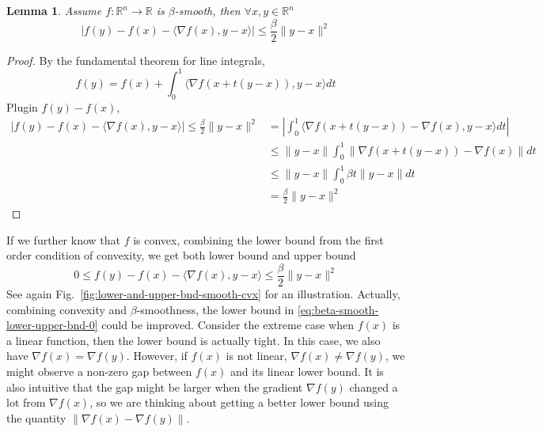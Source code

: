 \documentclass{scrartcl}
\newtheorem{lemma}{Lemma}
\newcommand{\RR}{\mathbb{R}}
\begin{document}
\begin{lemma}
  Assume $f:\RR^n\rightarrow \RR$ is $\beta$-smooth, then $\forall x,y\in\RR^n$
  \[
  |f(y)-f(x)- \langle \nabla f(x), y-x\rangle | \leq \frac{\beta}{2}\|y-x\|^2
  \]
\end{lemma}
\begin{proof}
By the fundamental theorem for line integrals,
\[
  f(y) = f(x) + \int_{0}^1 \langle \nabla f(x + t(y-x)), y-x\rangle dt
\]
Plugin $f(y)-f(x)$,
\[
  \begin{aligned}
  |f(y)-f(x)- \langle \nabla f(x), y-x\rangle | \leq \frac{\beta}{2}\|y-x\|^2
  &= \left| \int_0^1 \langle \nabla f(x+t(y-x))-\nabla f(x), y-x\rangle dt \right| \\
  &\leq \|y-x\|\int_0^1 \|\nabla f(x+t(y-x))-\nabla f(x)\| dt \\
  &\leq \|y-x\|\int_0^1 \beta t\|y-x\|dt \\
  &=\frac{\beta}{2}\|y-x\|^2
  \end{aligned}
\]
\end{proof}

If we further know that $f$ is convex, combining the lower bound from the first order condition of
convexity, we get both lower bound and upper bound
\begin{equation}
  0 \leq f(y) - f(x) - \langle \nabla f(x), y-x\rangle \leq \frac{\beta}{2}\|y-x\|^2
  \label{eq:beta-smooth-lower-upper-bnd-0}
\end{equation}
See again Fig.~\ref{fig:lower-and-upper-bnd-smooth-cvx} for an illustration. Actually, combining
convexity and $\beta$-smoothness, the lower bound in \eqref{eq:beta-smooth-lower-upper-bnd-0} could
be improved. Consider the extreme case when $f(x)$ is a linear function, then the lower bound is
actually tight. In this case, we also have $\nabla f(x)=\nabla f(y)$. However, if $f(x)$ is not
linear, $\nabla f(x)\neq \nabla f(y)$, we might observe a non-zero gap between $f(x)$ and its linear
lower bound. It is also intuitive that the gap might be larger when the gradient $\nabla f(y)$
changed a lot from $\nabla f(x)$, so we are thinking about getting a better lower bound using the
quantity $\|\nabla f(x)-\nabla f(y)\|$.
\end{document}
